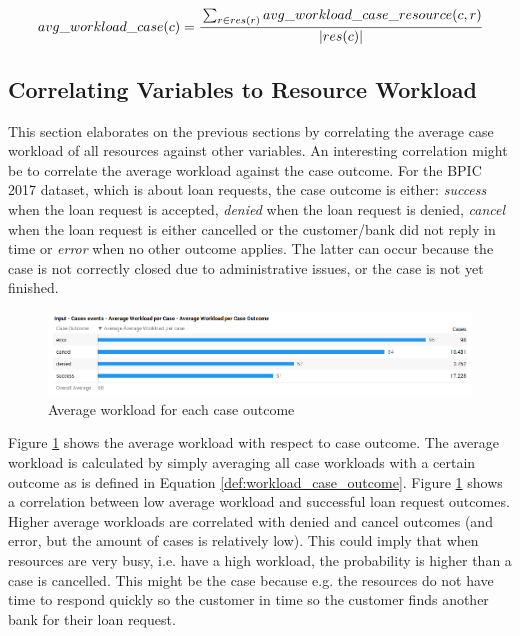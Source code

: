 \begin{equation}\label{def:workload_case_resources}
     avg\_workload\_case(c) = \cfrac{\sum_{r \in res(r)} avg\_workload\_case\_resource(c, r) }{|res(c)|}
\end{equation}

\subsection{Correlating Variables to Resource Workload}
This section elaborates on the previous sections by correlating the average case workload of all resources against other variables. An interesting correlation might be to correlate the average workload against the case outcome. For the BPIC 2017 dataset, which is about loan requests, the case outcome is either: \textit{success} when the loan request is accepted, \textit{denied} when the loan request is denied, \textit{cancel} when the loan request is either cancelled or the customer/bank did not reply in time or \textit{error} when no other outcome applies. The latter can occur because the case is not correctly closed due to administrative issues, or the case is not yet finished.

\begin{figure}[h]
	\centering
    \includegraphics[width=\textwidth]{figures/workload_case_outcome.png}
    \caption{Average workload for each case outcome}
    \label{fig:workload_case_outcome}
\end{figure}

Figure \ref{fig:workload_case_outcome} shows the average workload with respect to case outcome. The average workload is calculated by simply averaging all case workloads with a certain outcome as is defined in Equation \ref{def:workload_case_outcome}. Figure \ref{fig:workload_case_outcome} shows a correlation between low average workload and successful loan request outcomes. Higher average workloads are correlated with denied and cancel outcomes (and error, but the amount of cases is relatively low). This could imply that when resources are very busy, i.e. have a high workload, the probability is higher than a case is cancelled. This might be the case because e.g. the resources do not have time to respond quickly so the customer in time so the customer finds another bank for their loan request.  

